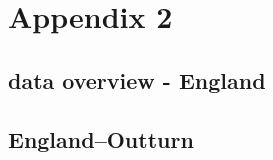 \documentclass[]{article}
\begin{document}
\hypertarget{appendix-2-1}{%
\section{Appendix 2}\label{appendix-2-1}}

\hypertarget{data-overview---england}{%
\subsection{data overview - England}\label{data-overview---england}}

\hypertarget{englandoutturn}{%
\subsection{England--Outturn}\label{englandoutturn}}
\end{document}
